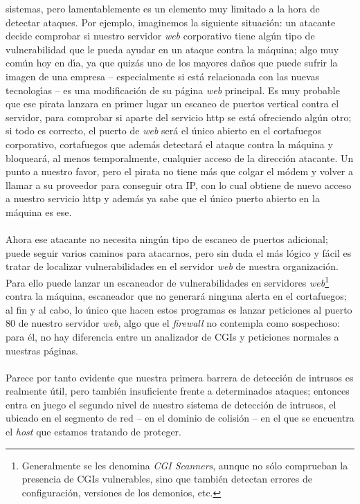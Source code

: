 sistemas, pero lamentablemente es un elemento muy limitado a la hora de 
detectar ataques. Por ejemplo, imaginemos la siguiente situaci\'on: un atacante
decide comprobar si nuestro servidor {\it web} corporativo tiene alg\'un tipo 
de vulnerabilidad que le pueda ayudar en un ataque contra la m\'aquina; algo
muy com\'un hoy en d\'{\i}a, ya que quiz\'as uno de los mayores da\~nos que 
puede sufrir la imagen de una empresa -- especialmente si est\'a relacionada 
con las nuevas tecnolog\'{\i}as -- es una modificaci\'on de su p\'agina {\it 
web} principal. Es muy probable que ese pirata lanzara en primer lugar un 
escaneo de puertos vertical contra el servidor, para comprobar si aparte del
servicio {\sc http} se est\'a ofreciendo alg\'un otro; si todo es correcto, el
puerto de {\it web} ser\'a el \'unico abierto en el cortafuegos corporativo,
cortafuegos que adem\'as detectar\'a el ataque contra la m\'aquina y 
bloquear\'a, al menos temporalmente, cualquier acceso de la direcci\'on 
atacante. Un punto a nuestro favor, pero el pirata no tiene m\'as que colgar
el m\'odem y volver a llamar a su proveedor para conseguir otra IP, con lo cual
obtiene de nuevo acceso a nuestro servicio {\sc http} y adem\'as ya sabe
que el \'unico puerto abierto en la m\'aquina es ese.\\
\\Ahora ese atacante no necesita ning\'un tipo de escaneo de puertos adicional;
puede seguir varios caminos para atacarnos, pero sin duda el m\'as l\'ogico y
f\'acil es tratar de localizar vulnerabilidades en el servidor {\it web} de 
nuestra
organizaci\'on. Para ello puede lanzar un escaneador de vulnerabilidades en 
servidores {\it web}\footnote{Generalmente se les denomina {\it CGI Scanners}, 
aunque no s\'olo comprueban la presencia de CGIs vulnerables, sino que 
tambi\'en detectan errores de configuraci\'on, versiones de los demonios, etc.}
contra la m\'aquina, escaneador que no generar\'a ninguna alerta en el 
cortafuegos; al fin y al cabo, lo \'unico que hacen estos programas es lanzar
peticiones al puerto 80 de nuestro servidor {\it web}, algo que el {\it 
firewall} no contempla como sospechoso: para \'el, no hay diferencia entre un 
analizador de CGIs y peticiones normales a nuestras p\'aginas.\\
\\Parece por tanto evidente que nuestra primera barrera de detecci\'on de
intrusos es realmente \'util, pero tambi\'en insuficiente frente a determinados
ataques; entonces entra en juego el segundo nivel de nuestro sistema de 
detecci\'on de intrusos, el ubicado en el segmento de red -- en el dominio de
colisi\'on -- en el que se encuentra el {\it host} que estamos tratando de
proteger.
